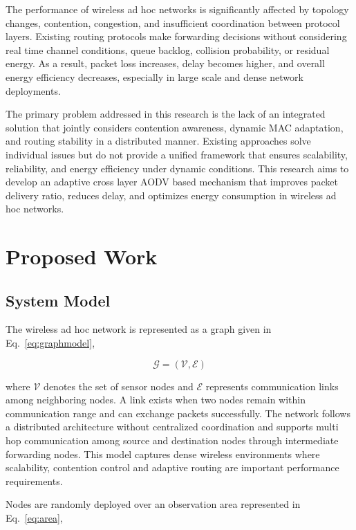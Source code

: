 \documentclass[a4paper,fleqn,final,1p]{cas-dc}
\numberwithin{equation}{section}
\begin{document}
The performance of wireless ad hoc networks is significantly affected by topology changes, contention, congestion, and insufficient coordination between protocol layers. Existing routing protocols make forwarding decisions without considering real time channel conditions, queue backlog, collision probability, or residual energy. As a result, packet loss increases, delay becomes higher, and overall energy efficiency decreases, especially in large scale and dense network deployments.

The primary problem addressed in this research is the lack of an integrated solution that jointly considers contention awareness, dynamic MAC adaptation, and routing stability in a distributed manner. Existing approaches solve individual issues but do not provide a unified framework that ensures scalability, reliability, and energy efficiency under dynamic conditions. This research aims to develop an adaptive cross layer AODV based mechanism that improves packet delivery ratio, reduces delay, and optimizes energy consumption in wireless ad hoc networks.


\section{Proposed Work}

\subsection{System Model}

The wireless ad hoc network is represented as a graph given in Eq.~\ref{eq:graphmodel},

\begin{equation}
\mathcal{G}=(\mathcal{V},\mathcal{E})
\label{eq:graphmodel}
\end{equation}

where $\mathcal{V}$ denotes the set of sensor nodes and $\mathcal{E}$ represents communication links among neighboring nodes. A link exists when two nodes remain within communication range and can exchange packets successfully. The network follows a distributed architecture without centralized coordination and supports multi hop communication among source and destination nodes through intermediate forwarding nodes. This model captures dense wireless environments where scalability, contention control and adaptive routing are important performance requirements.

Nodes are randomly deployed over an observation area represented in Eq.~\ref{eq:area},
\end{document}
